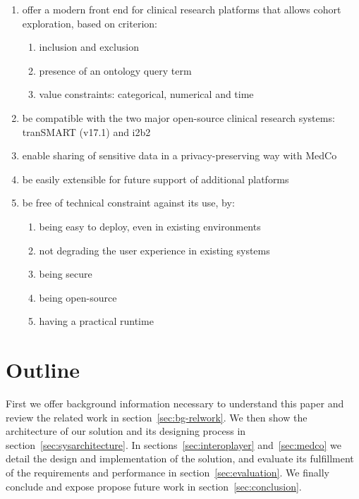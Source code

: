 \begin{enumerate}
    \item offer a modern front end for clinical research platforms that allows cohort exploration, based on criterion:
    \begin{enumerate}
        \item inclusion and exclusion
        \item presence of an ontology query term
        \item value constraints: categorical, numerical and time
    \end{enumerate}
    \item be compatible with the two major open-source clinical research systems: tranSMART (v17.1) and i2b2
    \item enable sharing of sensitive data in a privacy-preserving way with MedCo
    \item be easily extensible for future support of additional platforms
    \item be free of technical constraint against its use, by:
    \begin{enumerate}
        \item being easy to deploy, even in existing environments
        \item not degrading the user experience in existing systems
        \item being secure
        \item being open-source
        \item having a practical runtime
    \end{enumerate}
\end{enumerate}


\section{Outline}

First we offer background information necessary to understand this paper and review the related work in section~\ref{sec:bg-relwork}.
We then show the architecture of our solution and its designing process in  section~\ref{sec:sysarchitecture}.
In sections~\ref{sec:interoplayer} and~\ref{sec:medco} we detail the design and implementation of the solution, and evaluate its fulfillment of the requirements and performance in section~\ref{sec:evaluation}.
We finally conclude and expose propose future work in section~\ref{sec:conclusion}.